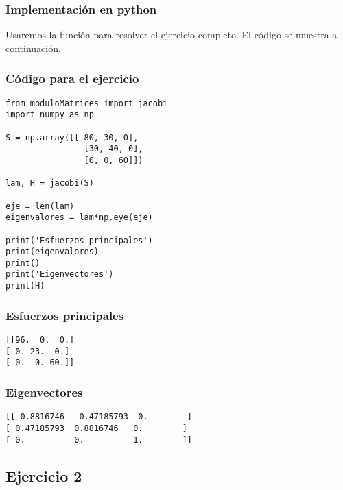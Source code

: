 \documentclass[12pt]{beamer}
\begin{document}
\begin{frame}
\frametitle{Implementación en python}
Usaremos la función  para resolver el ejercicio completo.
\pause
El código se muestra a continuación.
\end{frame}
\begin{frame}
\frametitle{Código para el ejercicio}
\begin{lstlisting}[caption=Código para resolver el problema de los esfuerzos principales]
from moduloMatrices import jacobi
import numpy as np

S = np.array([[ 80, 30, 0],
                [30, 40, 0],
                [0, 0, 60]])

lam, H = jacobi(S)

eje = len(lam)
eigenvalores = lam*np.eye(eje)

print('Esfuerzos principales')
print(eigenvalores)
print()
print('Eigenvectores')
print(H)
\end{lstlisting}
\end{frame}
\begin{frame}[fragile]
\frametitle{Esfuerzos principales}
\begin{verbatim}
[[96.  0.  0.]
[ 0. 23.  0.]
[ 0.  0. 60.]]
\end{verbatim}
\end{frame}
\begin{frame}[fragile]
\frametitle{Eigenvectores}
\fontsize{12}{12}\selectfont
\begin{verbatim}
[[ 0.8816746  -0.47185793  0.        ]
[ 0.47185793  0.8816746   0.        ]
[ 0.          0.          1.        ]]   
\end{verbatim}
\end{frame}

\subsection{Ejercicio 2}
\end{document}
